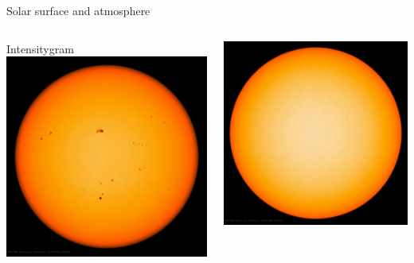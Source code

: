 \begin{frame}[plain,c]{Solar surface and atmosphere}{}
	\begin{columns}[c]
		
		\centering \small Intensitygram
		\includegraphics[width=\textwidth]{../talk_figures/20130516_170000_1024_HMIIC.jpg}
		
		\includegraphics[width=\textwidth]{../talk_figures/20181028_120000_1024_HMIIC.jpg}


\end{columns}
\end{frame}
